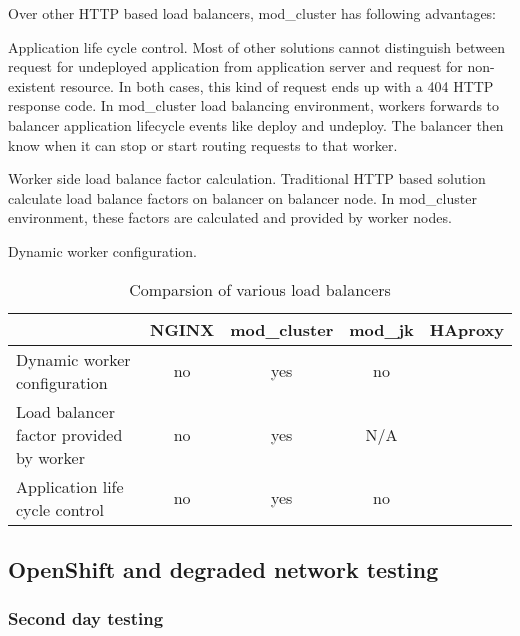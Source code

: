 \documentclass[
  master,
  biblatex,
  glossaries,
  index
]{kidiplom}
\begin{document}
Over other HTTP based load balancers, mod\_cluster has following advantages:

Application life cycle control. Most of other solutions cannot distinguish between request for undeployed application from application server and request for non-existent resource. In both cases, this kind of request ends up with a 404 HTTP response code. In mod\_cluster load balancing environment, workers forwards to balancer application lifecycle events like deploy and undeploy. The balancer then know when it can stop or start routing requests to that worker.\cite{bib:modcluster}

Worker side load balance factor calculation. Traditional HTTP based solution calculate load balance factors on balancer on balancer node. In mod\_cluster environment, these factors are calculated and provided by worker nodes.\cite{bib:modcluster}

Dynamic worker configuration. %

\begin{table}[]
\centering
\caption{Comparsion of various load balancers}
\label{my-label}
\begin{tabularx}{\linewidth}{X|cccc}
                                        & NGINX                             & mod\_cluster              & mod\_jk          & HAproxy \\ \hline
Dynamic worker configuration            & no\cite{bib:nginxlb}              & yes\cite{bib:modcluster}  & no               &         \\
Load balancer factor provided by worker & no\cite{bib:nginxlb}              & yes\cite{bib:modcluster}  & N/A\footnotemark &         \\
Application life cycle control          & no\footnotemark\cite{bib:nginxlb} & yes\cite{bib:modcluster}  & no               &
\end{tabularx}
\end{table}


\subsection{OpenShift and degraded network testing}


\subsubsection{Second day testing}
\end{document}
